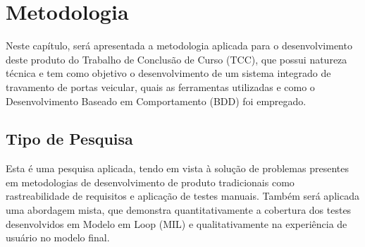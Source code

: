 \chapter{Metodologia} \label{ch:MM} %
Neste capítulo, será apresentada a metodologia aplicada para o desenvolvimento deste produto do Trabalho de Conclusão de Curso (TCC), que possui natureza técnica 
e tem como objetivo o desenvolvimento de um sistema integrado de travamento de portas veicular, quais as ferramentas utilizadas e como o Desenvolvimento Baseado 
em Comportamento (BDD) foi empregado.

\section{Tipo de Pesquisa} 
Esta é uma pesquisa aplicada, tendo em vista à solução de problemas presentes em metodologias de desenvolvimento de produto tradicionais como rastreabilidade 
de requisitos e aplicação de testes manuais. Também será aplicada uma abordagem mista, que demonstra quantitativamente a cobertura dos testes desenvolvidos em 
Modelo em Loop (MIL) e qualitativamente na experiência de usuário no modelo final.

